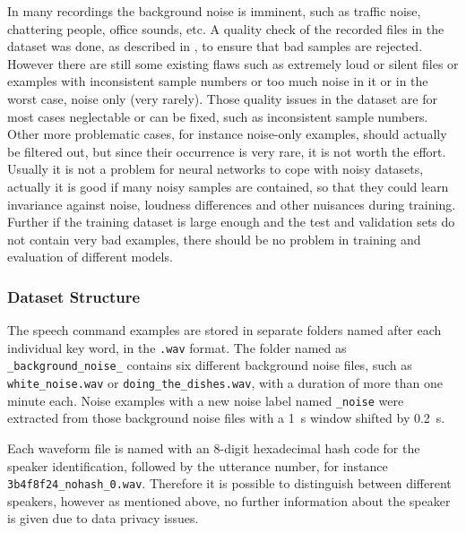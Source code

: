 In many recordings the background noise is imminent, such as traffic noise, chattering people, office sounds, etc.
A quality check of the recorded files in the dataset was done, as described in \cite{Warden2018}, to ensure that bad samples are rejected.
However there are still some existing flaws such as extremely loud or silent files or examples with inconsistent sample numbers or too much noise in it or in the worst case, noise only (very rarely).
Those quality issues in the dataset are for most cases neglectable or can be fixed, such as inconsistent sample numbers. 
Other more problematic cases, for instance noise-only examples, should actually be filtered out, but since their occurrence is very rare, it is not worth the effort.
Usually it is not a problem for neural networks to cope with noisy datasets, actually it is good if many noisy samples are contained, so that they could learn invariance against noise, loudness differences and other nuisances during training.
Further if the training dataset is large enough and the test and validation sets do not contain very bad examples, there should be no problem in training and evaluation of different models.



\subsubsection{Dataset Structure}
The speech command examples are stored in separate folders named after each individual key word, in the \texttt{.wav} format.
The folder named as \texttt{\_background\_noise\_} contains six different background noise files, such as \texttt{white\_noise.wav} or \texttt{doing\_the\_dishes.wav}, with a duration of more than one minute each.
Noise examples with a new noise label named \texttt{\_noise} were extracted from those background noise files with a \SI{1}{\second} window shifted by \SI{0.2}{\second}.

Each waveform file is named with an 8-digit hexadecimal hash code for the speaker identification, followed by the utterance number, for instance \texttt{3b4f8f24\_nohash\_0.wav}.
Therefore it is possible to distinguish between different speakers, however as mentioned above, no further information about the speaker is given due to data privacy issues.

